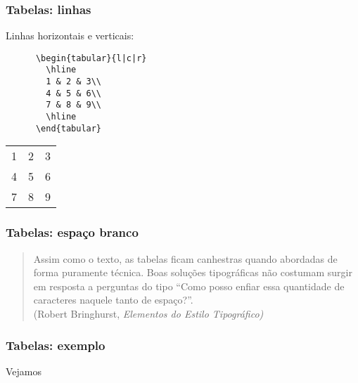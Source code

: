 \begin{frame}[fragile]
  \frametitle{Tabelas: linhas}
  \LARGE
  Linhas horizontais e verticais:
  \vspace{1em}

  \begin{minipage}{.65\textwidth}
    \begin{verbatim}
      \begin{tabular}{l|c|r}
        \hline
        1 & 2 & 3\\
        4 & 5 & 6\\
        7 & 8 & 9\\
        \hline
      \end{tabular}
    \end{verbatim}
  \end{minipage}
  \hspace{.05\textwidth}
  \begin{minipage}{.25\textwidth}
    \begin{tabular}{l|c|r}
      \hline
      1 & 2 & 3\\
      4 & 5 & 6\\
      7 & 8 & 9\\
      \hline
    \end{tabular}
  \end{minipage}
\end{frame}

\begin{frame}
  \frametitle{Tabelas: espaço branco}
  \large
  \begin{quote}
    Assim como o texto, as tabelas ficam canhestras quando abordadas de forma
    puramente técnica. Boas soluções tipográficas não costumam surgir em resposta
    a perguntas do tipo “Como posso enfiar essa quantidade de caracteres naquele
    tanto de espaço?”.\\[1em]

    (Robert Bringhurst, \emph{Elementos do Estilo Tipográfico)}
  \end{quote}
\end{frame}

\begin{frame}
  \frametitle{Tabelas: exemplo}
  \Huge
  Vejamos 
\end{frame}

